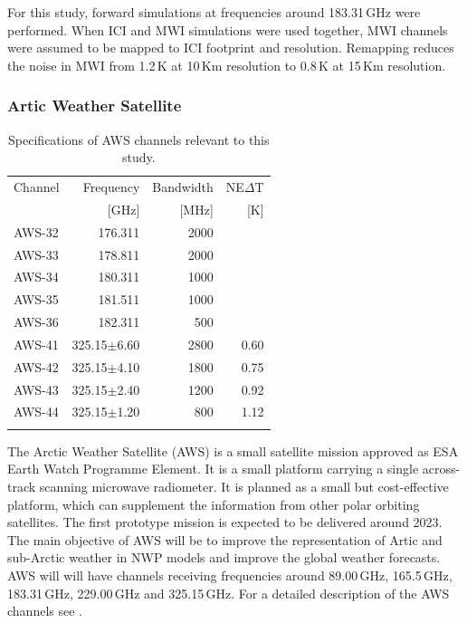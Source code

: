 \documentclass[amt, manuscript]{copernicus}
\begin{document}
For this study, forward simulations at frequencies around 183.31\,GHz were performed. When ICI and MWI simulations were used together, MWI channels were assumed to be mapped to ICI footprint and resolution. Remapping reduces the noise in MWI from 1.2\,K at 10\,Km resolution to 0.8\,K at 15\,Km resolution.  


\subsubsection{Artic Weather Satellite}
%
\begin{table}[t]
	\caption{Specifications of AWS channels relevant to this study.}
	\label{tab:specifications_AWS}	
	\begin{tabular}{lrrr}
		\tophline
		Channel & Frequency 	& Bandwidth & NE$\Delta$T \\
				& [GHz]			& [MHz]		& [K]		\\
		\middlehline
		AWS-32	&	176.311    & 2000	&		\\
		AWS-33	&	178.811    & 2000 	&	\\
		AWS-34	&	180.311    & 1000 	&	\\
		AWS-35	&	181.511    & 1000 	&	 \\
		AWS-36	&	182.311    & \phantom{0}500  &	 \\
		AWS-41  & 325.15$\pm$6.60    & 2800 	 &0.60\\
		AWS-42  & 325.15$\pm$4.10    & 1800    &0.75	\\
		AWS-43  & 325.15$\pm$2.40    & 1200    &0.92\\
		AWS-44  & 325.15$\pm$1.20    & \phantom{0}800  &1.12  \\
		\bottomhline
	\end{tabular}
	\belowtable{} %
\end{table}
The Arctic Weather Satellite (AWS) is a small satellite mission approved as ESA
Earth Watch Programme Element. It is a small platform carrying a single across-track scanning microwave radiometer. It is planned as a small but cost-effective platform, which can supplement the information from other polar orbiting satellites. The first prototype mission is expected to be delivered around 2023. The main objective of AWS will be to improve the representation of Artic and sub-Arctic weather in NWP models and improve the global weather forecasts. AWS will will have channels receiving frequencies around 89.00\,GHz, 165.5\,GHz, 183.31\,GHz, 229.00\,GHz and 325.15\,GHz. For a detailed description of the AWS channels see \citet{eriksson2020study}. 
\end{document}
